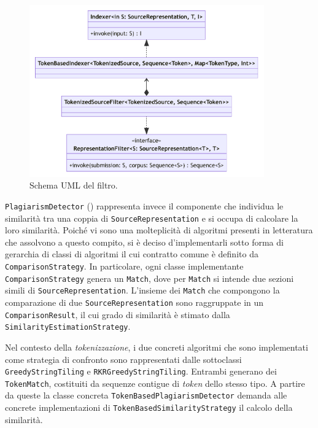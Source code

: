 \begin{figure}[h!]
    \centering
    \includegraphics[width=0.9\textwidth]{resources/img/02-filter.pdf}
    \caption{Schema UML del filtro.}
    \label{img:02-filter}
\end{figure}

\texttt{PlagiarismDetector} () rappresenta invece il componente che individua le similarità tra una coppia di \texttt{SourceRepresentation} e si occupa di calcolare la loro similarità.
%
Poiché vi sono una molteplicità di algoritmi presenti in letteratura che assolvono a questo compito, si è deciso d'implementarli sotto forma di gerarchia di classi di algoritmi il cui contratto comune è definito da \texttt{ComparisonStrategy}. 
%
In particolare, ogni classe implementante \texttt{ComparisonStrategy} genera un \texttt{Match}, dove per \texttt{Match} si intende due sezioni simili di \texttt{SourceRepresentation}.
%
L'insieme dei \texttt{Match} che compongono la comparazione di due \texttt{SourceRepresentation} sono raggruppate in un \texttt{ComparisonResult}, il cui grado di similarità è stimato dalla \texttt{SimilarityEstimationStrategy}.

Nel contesto della \textit{tokenizzazione}, i due concreti algoritmi che sono implementati come strategia di confronto sono rappresentati dalle sottoclassi \texttt{GreedyStringTiling} e \texttt{RKRGreedyStringTiling}.
%
Entrambi generano dei \texttt{TokenMatch}, costituiti da sequenze contigue di \textit{token} dello stesso tipo.
%
A partire da queste la classe concreta \texttt{TokenBasedPlagiarismDetector} demanda alle concrete implementazioni di \texttt{TokenBasedSimilarityStrategy} il calcolo della similarità.


